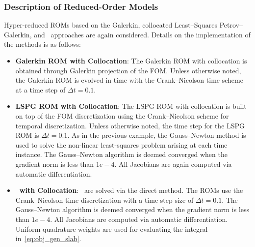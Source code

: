 \subsubsection{Description of Reduced-Order Models}
Hyper-reduced ROMs based on the Galerkin, collocated Least--Squares Petrov--Galerkin, and \methodAcronym\ approaches are 
again considered. Details on the implementation of the methods is as follows:
\begin{itemize}
\item \textbf{Galerkin ROM with Collocation}: The Galerkin ROM with collocation is obtained through Galerkin projection of the FOM. Unless 
otherwise noted, the  Galerkin ROM is evolved in time with the Crank--Nicolson time scheme at a time step of $\Delta t =0.1$.

\item \textbf{LSPG ROM with Collocation}: The LSPG ROM with collocation is built on top of the FOM discretization using the Crank--Nicolson scheme for temporal 
discretization. Unless otherwise noted, the time step for the LSPG ROM is $\Delta t  = 0.1$. As in the previous example, 
the Gauss--Newton method is used to solve the non-linear least-squares problem arising at each time instance. The Gauss--Newton 
algorithm is deemed converged when the gradient norm is less than $1e-4$. All Jacobians are again computed via automatic differentiation.
 
\item \textbf{\methodAcronymROMs\ with Collocation}: \methodAcronymROMs\ are solved via the direct method. The ROMs use the Crank--Nicolson time-discretization with a time-step size of 
$\Delta t = 0.1$. The Gauss--Newton algorithm is deemed converged when the gradient norm is less than $1e-4$. All Jacobians are computed via automatic differentiation. Uniform quadrature 
weights are used for evaluating the integral in~\eqref{eq:obj_gen_slab}. 
 
\end{itemize}


